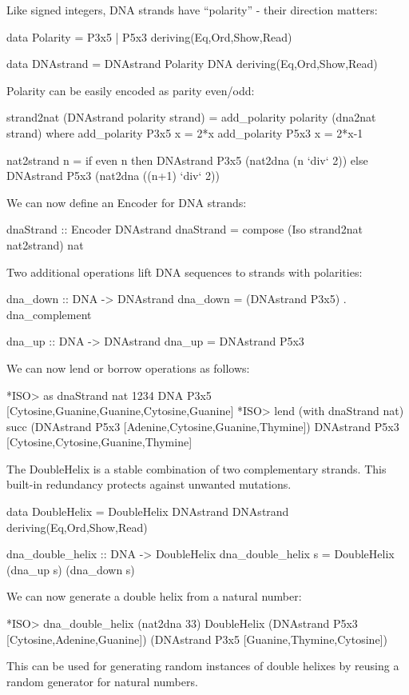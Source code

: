 \documentclass[]{INCLUDES/llncs}
\begin{document}
Like signed integers, DNA strands have ``polarity'' - their direction matters:
\begin{code}
data Polarity =  P3x5 | P5x3 
  deriving(Eq,Ord,Show,Read)

data DNAstrand = DNAstrand Polarity DNA 
  deriving(Eq,Ord,Show,Read)
\end{code}
Polarity can be easily encoded as parity even/odd:
\begin{code}
strand2nat (DNAstrand polarity strand) = 
  add_polarity polarity (dna2nat strand) where 
    add_polarity P3x5 x = 2*x
    add_polarity P5x3 x = 2*x-1
    
nat2strand n =
  if even n 
     then DNAstrand P3x5 (nat2dna (n `div` 2))
     else DNAstrand P5x3 (nat2dna ((n+1) `div` 2))
\end{code}
We can now define an Encoder for DNA strands:
\begin{code}
dnaStrand :: Encoder DNAstrand
dnaStrand = compose (Iso strand2nat nat2strand) nat
\end{code}
Two additional operations lift DNA sequences to strands with polarities:
\begin{code}
dna_down :: DNA -> DNAstrand
dna_down = (DNAstrand P3x5) . dna_complement

dna_up :: DNA -> DNAstrand
dna_up = DNAstrand P5x3
\end{code}
We can now lend or borrow operations as follows:
\begin{codex}
*ISO> as dnaStrand nat 1234
DNA P3x5 [Cytosine,Guanine,Guanine,Cytosine,Guanine]
*ISO> lend (with dnaStrand nat) succ 
   (DNAstrand P5x3 [Adenine,Cytosine,Guanine,Thymine])
DNAstrand P5x3 [Cytosine,Cytosine,Guanine,Thymine]
\end{codex}

The DoubleHelix is a stable combination of two complementary
strands. This built-in redundancy protects against unwanted
mutations.
\begin{code}
data DoubleHelix = DoubleHelix DNAstrand DNAstrand
   deriving(Eq,Ord,Show,Read)

dna_double_helix :: DNA -> DoubleHelix
dna_double_helix s = 
  DoubleHelix (dna_up s) (dna_down s)
\end{code}
We can now generate a double helix from a natural number:
\begin{codex}
*ISO> dna_double_helix (nat2dna 33)
DoubleHelix 
  (DNAstrand P5x3 [Cytosine,Adenine,Guanine])
  (DNAstrand P3x5 [Guanine,Thymine,Cytosine])
\end{codex}
This can be used for generating random instances of double helixes
by reusing a random generator for natural numbers.
\end{document}
